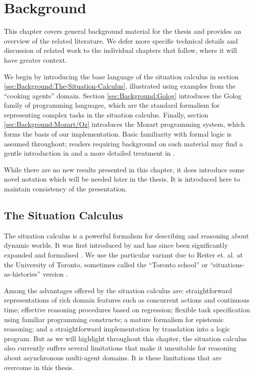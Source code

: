 

\chapter{Background}

\label{ch:background}

This chapter covers general background material for the thesis and
provides an overview of the related literature. We defer more specific
technical details and discussion of related work to the individual
chapters that follow, where it will have greater context.

We begin by introducing the base language of the situation calculus
in section \ref{sec:Background:The-Situation-Calculus}, illustrated
using examples from the {}``cooking agents'' domain. Section \ref{sec:Background:Golog}
introduces the Golog family of programming languages, which are the
standard formalism for representing complex tasks in the situation
calculus. Finally, section \ref{sec:Background:Mozart/Oz} introduces the Mozart
programming system, which forms the basis of our implementation. Basic
familiarity with formal logic is assumed throughout; readers requiring
background on such material may find a gentle introduction in
\citep{kelly96logic} and a more detailed treatment in \citep{fitting96fol_book}.

While there are no new results presented in this chapter, it does
introduce some novel notation which will be needed later in the thesis.
It is introduced here to maintain consistency of the presentation.


\section{The Situation Calculus\label{sec:Background:The-Situation-Calculus}}

The situation calculus is a powerful formalism for describing and
reasoning about dynamic worlds. It was first introduced by \citet{McCHay69sitcalc}
and has since been significantly expanded and formalised \citep{reiter91frameprob,pirri99contributions_sitcalc}.
We use the particular variant due to Reiter et. al. at the University
of Toronto, sometimes called the {}``Toronto school'' or {}``situations-as-histories''
version \citep{levesque98sc_foundations,pirri99contributions_sitcalc}.

Among the advantages offered by the situation calculus are: straightforward
representations of rich domain features such as concurrent actions
and continuous time; effective reasoning procedures based on regression;
flexible task specification using familiar programming constructs;
a mature formalism for epistemic reasoning; and a straightforward
implementation by translation into a logic program. But as we will
highlight throughout this chapter, the situation calculus also currently
suffers several limitations that make it unsuitable for reasoning
about asynchronous multi-agent domains. It is these limitations that
are overcome in this thesis.


